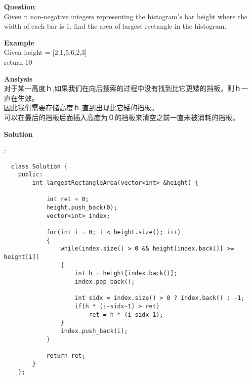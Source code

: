     
\begin{description}
    \item{\textbf{Question}}:\\%
		Given n non-negative integers representing the histogram's bar height where the width of each bar is 1, find the area of largest rectangle in the histogram.\\

    \item{\textbf{Example}}\\
		Given height = [2,1,5,6,2,3]\\
		return 10\\

    \item{\textbf{Anslysis}}\\
		对于某一高度ｈ,如果我们在向后搜索的过程中没有找到比它更矮的挡板，则ｈ一直在生效。\\
		因此我们需要存储高度ｈ,直到出现比它矮的挡板。\\
		可以在最后的挡板后面插入高度为０的挡板来清空之前一直未被消耗的挡板。\\

    \item{\textbf{Solution}}\\
	\item{} : \\
		\begin{lstlisting}
  class Solution {
    public:
        int largestRectangleArea(vector<int> &height) {

            int ret = 0;
            height.push_back(0);
            vector<int> index;

            for(int i = 0; i < height.size(); i++)
            {
                while(index.size() > 0 && height[index.back()] >= height[i])
                {
                    int h = height[index.back()];
                    index.pop_back();

                    int sidx = index.size() > 0 ? index.back() : -1;
                    if(h * (i-sidx-1) > ret)
                        ret = h * (i-sidx-1);
                }
                index.push_back(i);
            }

            return ret;
        }
    };
		\end{lstlisting}

\end{description}

